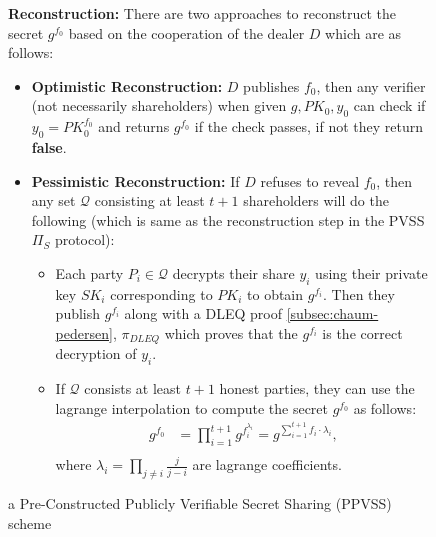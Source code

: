 \begin{figure}[ht]
{\begin{tcolorbox}[title=\textbf{$\Lambda_{RO}$ \cite{cryptoeprint:2025/576}}, width=1.2\textwidth, colframe=blue!75!black, colback=blue!10, sharp corners]
        \vspace{0.5em}
        \textbf{Reconstruction:}
            There are two approaches to reconstruct the secret $g^{f_0}$ based on the 
            cooperation of the dealer $D$ which are as follows:
            \begin{itemize}
                \item \textbf{Optimistic Reconstruction:} $D$ publishes $f_0$, then any verifier (not necessarily shareholders) 
                when given $g,PK_0,y_0$ can check if $y_0=PK_0^{f_0}$ and returns $g^{f_0}$ 
                if the check passes, if not they return \textbf{false}.
                \item \textbf{Pessimistic Reconstruction:} If $D$ refuses to reveal $f_0$, then any set 
                $\mathcal{Q}$ consisting at least $t+1$ shareholders will do the following (which 
                is same as the reconstruction step in the PVSS $\Pi_S$ protocol):
                \begin{itemize}
                    \item Each party $P_i\in\mathcal{Q}$ decrypts their share $y_i$ using their private key $SK_i$ 
                      corresponding to $PK_i$ to obtain $g^{f_i}$. Then they publish $g^{f_i}$ 
                      along with a DLEQ proof \ref{subsec:chaum-pedersen}, $\pi_{DLEQ}$ which proves that the 
                       $g^{f_i}$ is the correct decryption of $y_i$.
                    \item If $\mathcal{Q}$ consists at least $t+1$ honest parties, they can use the 
                    lagrange interpolation to compute the secret $g^{f_0}$ as follows:
                    \begin{align*}
                        g^{f_0} &= \prod_{i=1}^{t+1} g^{f_i^{\lambda_i}} = g^{\sum_{i=1}^{t+1}f_i\cdot\lambda_i},\\
                    \end{align*}
                    where $\lambda_i=\prod_{j\neq i}\frac{j}{j-i}$ are lagrange coefficients.
                \end{itemize}
            \end{itemize}
    \end{tcolorbox}
    }
    \caption[PPVSS Scheme]{a Pre-Constructed Publicly Verifiable Secret Sharing (PPVSS) scheme}
    \label{fig:ppvss}
\end{figure}